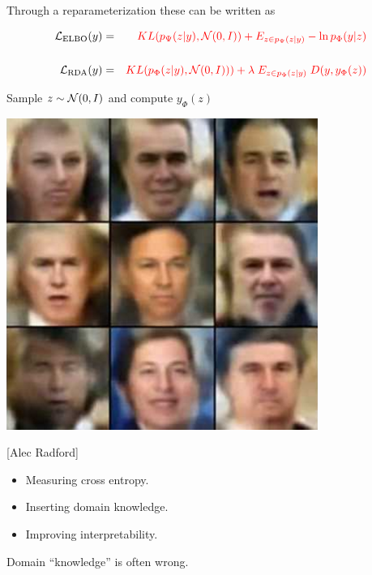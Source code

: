 {\vfill
Through a reparameterization these can be written as

\begin{eqnarray*}
{\cal L}_{\mathrm{ELBO}}(y) & = & {\color{red}  KL(p_\Psi(z|y),{\cal N}(0,I)) + E_{z \in p_\Psi(z|y)} - \ln p_\Phi(y|z)} \\
\\
{\cal L}_{\mathrm{RDA}}(y) & = & {\color{red}  KL(p_\Phi(z|y),{\cal N}(0,I))) + \lambda\;E_{z \in p_\Phi(z|y)}\; D(y,y_\Phi(z))}
\end{eqnarray*}


\centerline{Sample {\color{red} $z \sim {\cal N}(0,I)$} and compute {\color{red} $y_\Phi(z)$}}

\vfill
\centerline{\includegraphics[width = 4in]{../images/VariationalFaces}}
\centerline{[Alec Radford]}


\begin{itemize}
\item Measuring cross entropy.

\vfill
\item Inserting domain knowledge.

\vfill
\item Improving interpretability.
\end{itemize}


\centerline{Domain ``knowledge'' is often wrong.}



}



